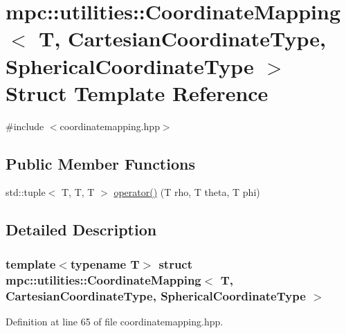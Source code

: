 \hypertarget{structmpc_1_1utilities_1_1_coordinate_mapping_3_01_t_00_01_cartesian_coordinate_type_00_01_spherical_coordinate_type_01_4}{}\section{mpc\+:\+:utilities\+:\+:Coordinate\+Mapping$<$ T, Cartesian\+Coordinate\+Type, Spherical\+Coordinate\+Type $>$ Struct Template Reference}
\label{structmpc_1_1utilities_1_1_coordinate_mapping_3_01_t_00_01_cartesian_coordinate_type_00_01_spherical_coordinate_type_01_4}


{\ttfamily \#include $<$coordinatemapping.\+hpp$>$}

\subsection*{Public Member Functions}
\begin{DoxyCompactItemize}
\item 
std\+::tuple$<$ T, T, T $>$ \mbox{\hyperlink{structmpc_1_1utilities_1_1_coordinate_mapping_3_01_t_00_01_cartesian_coordinate_type_00_01_spherical_coordinate_type_01_4_a7a19325e577f99582bd180b87dd932ad}{operator()}} (T rho, T theta, T phi)
\end{DoxyCompactItemize}


\subsection{Detailed Description}
\subsubsection*{template$<$typename T$>$\newline
struct mpc\+::utilities\+::\+Coordinate\+Mapping$<$ T, Cartesian\+Coordinate\+Type, Spherical\+Coordinate\+Type $>$}



Definition at line 65 of file coordinatemapping.\+hpp.



